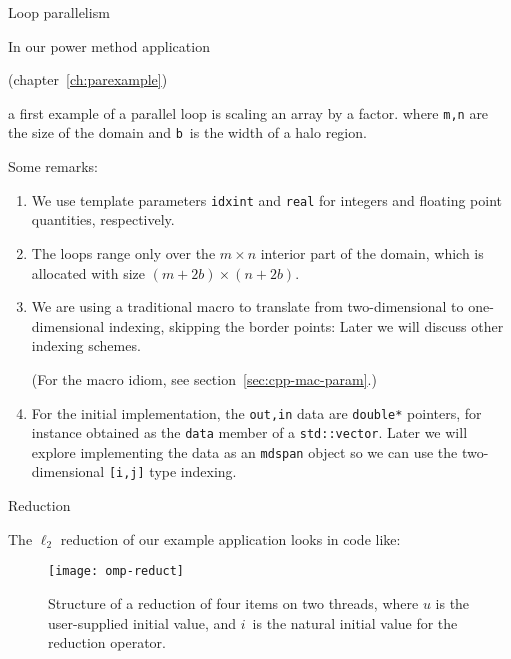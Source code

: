 
 {Loop parallelism}
\label{sec:d2d-omp1d}

In our power method application
\begin{packt}
  (chapter~\ref{ch:parexample})
\end{packt}
a first example of a parallel loop is scaling an array by a factor.
%
%
where \lstinline{m,n} are the size of the domain and \lstinline{b}~is the
width of a halo region.

Some remarks:
\begin{enumerate}
\item We use template parameters \lstinline{idxint} and \lstinline{real}
  for integers and floating point quantities, respectively.
\item
  The loops range only over the $m\times n$ interior part of the domain,
  which is allocated with size $(m+2b)\times(n+2b)$.
\item We are using a traditional macro to translate from two-dimensional
  to one-dimensional indexing, skipping the border points:
  Later we will discuss other indexing schemes.
\begin{packt}
    (For the macro idiom, see section~\ref{sec:cpp-mac-param}.)
\end{packt}
\item
  For the initial implementation, the \lstinline{out,in} data
  are \lstinline{double*} pointers, for instance obtained
  as the \lstinline{data} member of a \lstinline{std::vector}.
  Later we will explore implementing the data as an \lstinline{mdspan} object
  so we can use the two-dimensional \lstinline{[i,j]} type indexing.
\end{enumerate}

 {Reduction}

The $\ell_2$ reduction of our example application
looks in code like:
%

\begin{figure}[t]
  \texttt{[image: omp-reduct]}
  \caption{Structure of a reduction of four items on two threads,
    where $u$ is the user-supplied initial value,
    and $i$~is the natural initial value for the reduction operator.}
  \label{fig:omp-reduct}
\end{figure}

